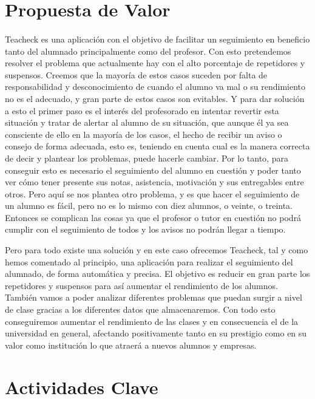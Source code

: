 \section{Propuesta de Valor}

\paragraph{}
Teacheck es una aplicación con el objetivo de facilitar un seguimiento
en beneficio tanto del alumnado principalmente como del profesor. Con
esto pretendemos resolver el problema que actualmente hay con el alto
porcentaje de repetidores y suspensos. Creemos que la mayoría de estos
casos suceden por falta de responsabilidad y desconocimiento de cuando
el alumno va mal o su rendimiento no es el adecuado, y gran parte de
estos casos son evitables. Y para dar solución a esto el primer paso
es el interés del profesorado en intentar revertir esta situación y
tratar de alertar al alumno de su situación, que aunque él ya sea
consciente de ello en la mayoría de los casos, el hecho de recibir un
aviso o consejo de forma adecuada, esto es, teniendo en cuenta cual es
la manera correcta de decir y plantear los problemas, puede hacerle
cambiar. Por lo tanto, para conseguir esto es necesario el seguimiento
del alumno en cuestión y poder tanto ver cómo tener presente sus
notas, asistencia, motivación y sus entregables entre otros. Pero aquí
se nos plantea otro problema, y es que hacer el seguimiento de un
alumno es fácil, pero no es lo mismo con diez alumnos, o veinte, o
treinta. Entonces se complican las cosas ya que el profesor o tutor en
cuestión no podrá cumplir con el seguimiento de todos y los avisos no
podrán llegar a tiempo.

Pero para todo existe una solución y en este caso ofrecemos Teacheck,
tal y como hemos comentado al principio, una aplicación para realizar
el seguimiento del alumnado, de forma automática y precisa. El
objetivo es reducir en gran parte los repetidores y suspensos para así
aumentar el rendimiento de los alumnos. También vamos a poder analizar
diferentes problemas que puedan surgir a nivel de clase gracias a los
diferentes datos que almacenaremos. Con todo esto conseguiremos
aumentar el rendimiento de las clases y en consecuencia el de la
universidad en general, afectando positivamente tanto en su prestigio
como en su valor como institución lo que atraerá a nuevos alumnos y
empresas.

\section{Actividades Clave}

